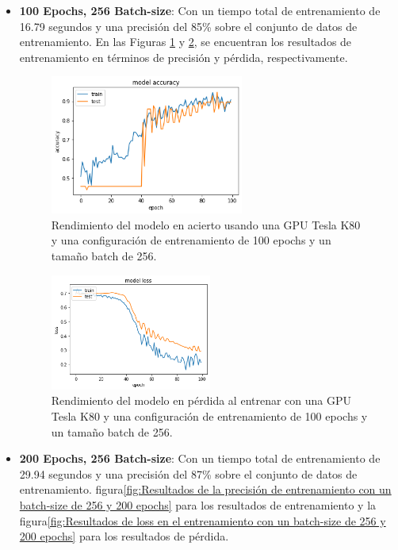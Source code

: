 \begin{itemize}
    \item \textbf{100 Epochs, 256 Batch-size}: Con un tiempo total de entrenamiento de 16.79 segundos y una precisión del 85\% sobre el conjunto de datos de entrenamiento.
    En las Figuras \ref{fig:Resultados de la precisión de entrenamiento con un batch-size de 256 y 100 epochs} y \ref{fig:Resultados de loss en el entrenamiento con un batch-size de 256 y 100 epochs}, se encuentran los resultados de entrenamiento en términos de precisión y pérdida, respectivamente.

\begin{figure}
    \centering
    \includegraphics[width=0.6\textwidth]{images/chapter5/batch_256_100_epoch.png}
    \caption{Rendimiento del modelo en acierto usando una GPU Tesla K80 y una configuración de entrenamiento de 100 epochs y un tamaño batch de 256.}
    \label{fig:Resultados de la precisión de entrenamiento con un batch-size de 256 y 100 epochs}
\end{figure}

\begin{figure}
    \centering
    \includegraphics[width=0.5\textwidth]{images/chapter5/batch_256_100_epoch_loss.png}
    \caption{Rendimiento del modelo en pérdida al entrenar con una GPU Tesla K80 y una configuración de entrenamiento de 100 epochs y un tamaño batch de 256.}
    \label{fig:Resultados de loss en el entrenamiento con un batch-size de 256 y 100 epochs}
\end{figure}

    \item \textbf{200 Epochs, 256 Batch-size}: Con un tiempo total de entrenamiento de 29.94 segundos y una precisión del 87\% sobre el conjunto de datos de entrenamiento.
    \Ver figura\ref{fig:Resultados de la precisión de entrenamiento con un batch-size de 256 y 200 epochs} para los resultados de entrenamiento y la figura\ref{fig:Resultados de loss en el entrenamiento con un batch-size de 256 y 200 epochs} para los resultados de pérdida.
\end{itemize}

